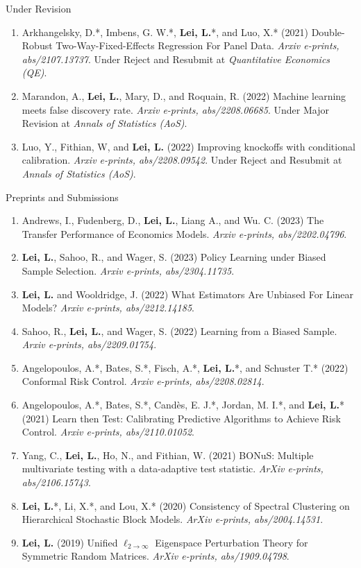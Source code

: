 \documentclass{article}
\begin{document}
\begin{large}
\noindent Under Revision
\end{large}

\begin{enumerate}
\item Arkhangelsky, D.*, Imbens, G. W.*, \textbf{Lei, L.}*, and Luo, X.* (2021) Double-Robust Two-Way-Fixed-Effects Regression For Panel Data. \emph{Arxiv e-prints, abs/2107.13737}. Under Reject and Resubmit at \emph{Quantitative Economics (QE)}.
\item Marandon, A., \textbf{Lei, L.}, Mary, D., and Roquain, R. (2022) Machine learning meets false discovery rate. \emph{Arxiv e-prints, abs/2208.06685}. Under Major Revision at \emph{Annals of Statistics (AoS)}.
\item Luo, Y., Fithian, W, and \textbf{Lei, L.} (2022) Improving knockoffs with conditional calibration. \emph{Arxiv e-prints, abs/2208.09542}. Under Reject and Resubmit at \emph{Annals of Statistics (AoS)}.
\end{enumerate}

\begin{large}
\noindent Preprints and Submissions
\end{large}

\begin{enumerate}
\item Andrews, I., Fudenberg, D., \textbf{Lei, L.}, Liang A., and Wu. C. (2023) The Transfer Performance of Economics Models. \emph{Arxiv e-prints, abs/2202.04796}.
\item \textbf{Lei, L.}, Sahoo, R., and Wager, S. (2023) Policy Learning under Biased Sample Selection. \emph{Arxiv e-prints, abs/2304.11735}.  
\item \textbf{Lei, L.} and Wooldridge, J. (2022) What Estimators Are Unbiased For Linear Models? \emph{Arxiv e-prints, abs/2212.14185}.
\item Sahoo, R., \textbf{Lei, L.}, and Wager, S. (2022) Learning from a Biased Sample. \emph{Arxiv e-prints, abs/2209.01754}.
\item Angelopoulos, A.*, Bates, S.*, Fisch, A.*, \textbf{Lei, L.}*, and Schuster T.* (2022) Conformal Risk Control. \emph{Arxiv e-prints, abs/2208.02814}.
\item Angelopoulos, A.*, Bates, S.*, Cand\`{e}s, E. J.*, Jordan, M. I.*, and \textbf{Lei, L.}* (2021) Learn then Test: Calibrating Predictive Algorithms to Achieve Risk Control. \emph{Arxiv e-prints, abs/2110.01052}.
\item Yang, C., \textbf{Lei, L.}, Ho, N., and Fithian, W. (2021) BONuS: Multiple multivariate testing with a data-adaptive test statistic. \emph{ArXiv e-prints, abs/2106.15743}.
\item \textbf{Lei, L.}*, Li, X.*, and Lou, X.* (2020) Consistency of Spectral Clustering on Hierarchical Stochastic Block Models. \emph{ArXiv e-prints, abs/2004.14531}.
\item \textbf{Lei, L.} (2019) Unified $\ell_{2\rightarrow\infty}$ Eigenspace Perturbation Theory for Symmetric Random Matrices. \emph{ArXiv e-prints, abs/1909.04798}.
\end{enumerate}
\end{document}
